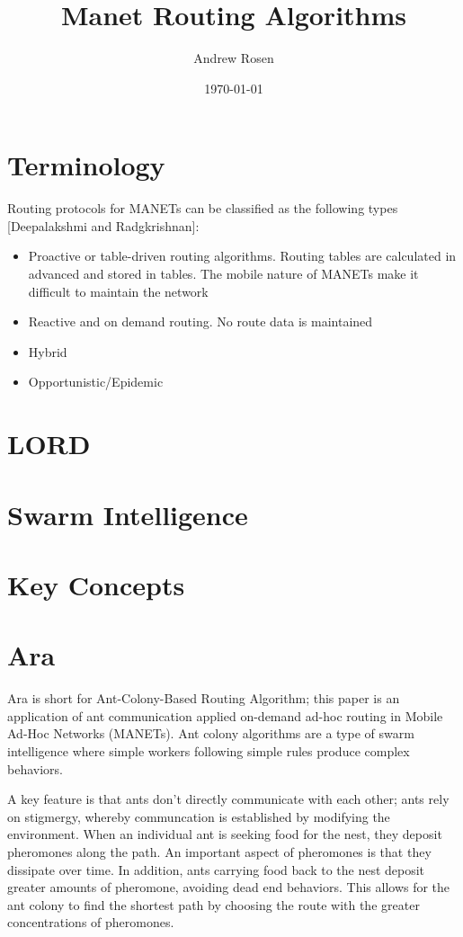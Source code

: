 \documentclass[a4paper]{article}
\title{Manet Routing Algorithms}
\author{Andrew Rosen}
\date{\today}
\begin{document}
\maketitle

\section{Terminology}

Routing protocols for MANETs can be classified as the following types \cite{singh2012ant} \cite{correia2010simple}  [Deepalakshmi and Radgkrishnan]:

\begin{itemize}
	\item Proactive or table-driven routing algorithms.  Routing tables are calculated in advanced and stored in tables.  The mobile nature of MANETs make it difficult to maintain the network
	\item Reactive and on demand routing.   No route data is maintained
	\item Hybrid
	\item Opportunistic/Epidemic
\end{itemize}



\section{LORD}

\cite{shen2013scalable}

\section{Swarm Intelligence}

\section{Key Concepts}

\section{Ara}
Ara \cite{ara-ants} is short for Ant-Colony-Based Routing Algorithm; this paper is an application of ant communication applied on-demand ad-hoc routing in Mobile Ad-Hoc Networks (MANETs).
Ant colony algorithms are a type of swarm intelligence where simple workers following simple rules produce complex behaviors.  


A key feature is that ants don't directly communicate with each other; ants rely on stigmergy, whereby communcation is established by modifying the environment.
When an individual ant is seeking food for the nest, they deposit pheromones along the path.  An important aspect of pheromones is that they dissipate over time.  In addition, ants carrying food back to the nest deposit greater amounts of pheromone, avoiding dead end behaviors.  This allows for the ant colony to find the shortest path by choosing the route with the greater concentrations of pheromones. 
\end{document}
